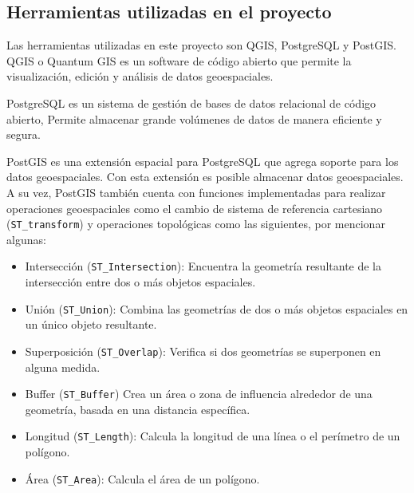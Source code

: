 
\subsection{Herramientas utilizadas en el proyecto}

Las herramientas utilizadas en este proyecto son QGIS, PostgreSQL y PostGIS.
QGIS o Quantum GIS es un software de código abierto que permite la
visualización, edición y análisis de datos geoespaciales. 

PostgreSQL es un sistema de gestión de bases de datos relacional de código
abierto, Permite almacenar grande volúmenes de datos de manera eficiente y
segura.

PostGIS es una extensión espacial para PostgreSQL que agrega soporte para los
datos geoespaciales. Con esta extensión es posible almacenar datos
geoespaciales. A su vez, PostGIS también cuenta con funciones implementadas para
realizar operaciones geoespaciales como el cambio de sistema de referencia
cartesiano (\texttt{ST\_transform}) y operaciones topológicas como las
siguientes, por mencionar algunas:

\begin{itemize}
\item Intersección (\texttt{ST\_Intersection}): Encuentra la geometría resultante de la
intersección entre dos o más objetos espaciales.

\item Unión (\texttt{ST\_Union}): Combina las geometrías de dos o más objetos espaciales en un
único objeto resultante.

\item Superposición (\texttt{ST\_Overlap}): Verifica si dos geometrías se superponen en alguna
medida.

\item Buffer (\texttt{ST\_Buffer}) Crea un área o zona de influencia alrededor de una geometría, basada en
una distancia específica.

\item Longitud (\texttt{ST\_Length}): Calcula la longitud de una línea o el perímetro de un
polígono.

\item Área (\texttt{ST\_Area}): Calcula el área de un polígono.

\end{itemize}